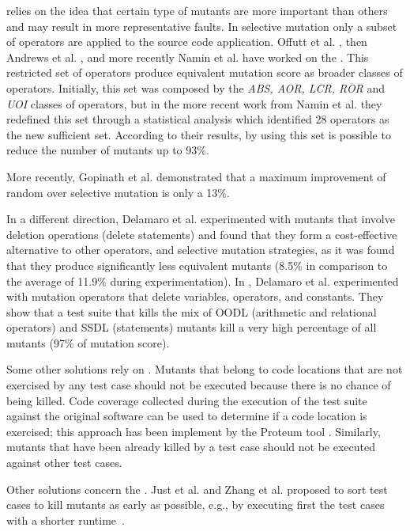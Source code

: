  relies on the idea that certain type of mutants are more important than others and may result in more representative faults. In selective mutation only a subset of operators are applied to the source code application.
Offutt et al. \cite{offutt1996experimental}, then Andrews et al. \cite{andrews2005mutation}, and more recently Namin et al. \cite{siami2008sufficient} have worked on the . This restricted set of operators produce equivalent mutation score as broader classes of operators. Initially, this set was composed by the \textit{ABS, AOR, LCR, ROR} and \textit{UOI} classes of operators, but in the more recent work from Namin et al. \cite{siami2008sufficient} they redefined this set through a statistical analysis which identified 28 operators as the new sufficient set. According to their results, by using this set is possible to reduce the number of mutants up to 93\%. 

More recently, Gopinath et al. \cite{gopinath2016limits} demonstrated that a maximum improvement of random over selective mutation is only a 13\%.

In a different direction, Delamaro et al. \cite{delamaro2014designing,delamaro2014experimental} experimented with mutants that involve deletion operations (delete statements) and found that they form a cost-effective alternative to other operators, and selective mutation strategies, as it was found that they produce significantly less equivalent mutants (8.5\% in comparison to the average of 11.9\% during experimentation). 
In \cite{delamaro2014experimental}, Delamaro et al. experimented with mutation operators that delete variables, operators, and constants. They show that a test suite that kills the mix of OODL (arithmetic and relational operators) and SSDL (statements) mutants kill a very high percentage of all mutants (97\% of mutation score).

Some other solutions rely on . Mutants that belong to code locations that are not exercised by any test case should not be executed because there is no chance of being killed. Code coverage collected during the execution of the test suite against the original software can be used to determine if a code location is exercised; this approach has been implement by the Proteum tool \cite{delamaro1996proteum}.
Similarly, mutants that have been already killed by a test case should not be executed against other test cases.

Other solutions concern the . Just et al. \cite{just2012using} and Zhang et al. \cite{zhang2013faster} proposed to sort test cases to kill mutants as early as possible, e.g., by executing first the test cases with a shorter runtime~\cite{just2012using}. 

